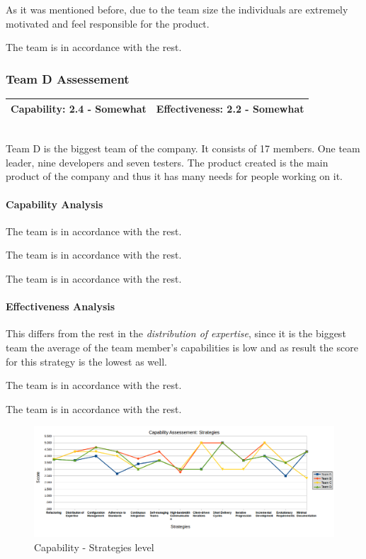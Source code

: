 As it was mentioned before, due to the team size the individuals are extremely motivated and feel responsible for the product.

The team is in accordance with the rest.


\subsubsection{Team D Assessement}
\begin{tabular}{| p{6cm} | p{6cm}|}
\hline
\textbf{Capability:} 2.4 - Somewhat & \textbf{Effectiveness:} 2.2 - Somewhat \\ \hline
\end{tabular} \\

Team D is the biggest team of the company. It consists of 17 members. One team leader, nine developers and seven testers. The product created is the main product of the company and thus it has many needs for people working on it. 

\paragraph{Capability Analysis}

The team is in accordance with the rest.

The team is in accordance with the rest.

The team is in accordance with the rest.

\paragraph{Effectiveness Analysis}

This differs from the rest in the \textit{distribution of expertise}, since it is the biggest team the average of the team member's capabilities is low and as result the score for this strategy is the lowest as well.

The team is in accordance with the rest.

The team is in accordance with the rest.


\begin{figure}[H]
\centerline{\includegraphics[scale=0.55]{include/case_study/fig/team_capability_strategies.png}}
\caption{Capability - Strategies level} 
\label{fig:team_capability_strategies}
\end{figure}

